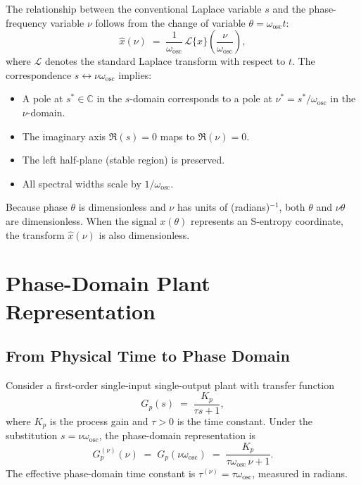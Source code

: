 \documentclass[10pt,twocolumn]{article}
\theoremstyle{plain}
\theoremstyle{definition}
\theoremstyle{remark}
\newcommand{\omegaosc}{\omega_{\mathrm{osc}}}
\begin{document}
The relationship between the conventional Laplace variable $s$ and the
phase-frequency variable $\nu$ follows from the change of variable
$\theta = \omegaosc t$:
\begin{equation}
  \hat{x}(\nu) \;=\; \frac{1}{\omegaosc}\,\mathcal{L}\{x\}
                      \!\left(\frac{\nu}{\omegaosc}\right),
  \label{eq:pdlt_conv}
\end{equation}
where $\mathcal{L}$ denotes the standard Laplace transform with respect
to $t$.  The correspondence $s \leftrightarrow \nu\omegaosc$ implies:

\begin{itemize}
  \item A pole at $s^* \in \mathbb{C}$ in the $s$-domain corresponds to
        a pole at $\nu^* = s^*/\omegaosc$ in the $\nu$-domain.
  \item The imaginary axis $\Re(s) = 0$ maps to $\Re(\nu) = 0$.
  \item The left half-plane (stable region) is preserved.
  \item All spectral widths scale by $1/\omegaosc$.
\end{itemize}

Because phase $\theta$ is dimensionless and $\nu$ has units of
(radians)$^{-1}$, both $\theta$ and $\nu\theta$ are dimensionless.
When the signal $x(\theta)$ represents an S-entropy coordinate, the
transform $\hat{x}(\nu)$ is also dimensionless.

\section{Phase-Domain Plant Representation}
\label{sec:plant}

\subsection{From Physical Time to Phase Domain}
\label{ssec:phys2phase}

Consider a first-order single-input single-output plant with transfer
function
\begin{equation}
  G_p(s) \;=\; \frac{K_p}{\tau s + 1},
  \label{eq:firstorder}
\end{equation}
where $K_p$ is the process gain and $\tau > 0$ is the time constant.
Under the substitution $s = \nu\omegaosc$, the phase-domain
representation is
\begin{equation}
  G_p^{(\nu)}(\nu) \;=\; G_p(\nu\omegaosc)
  \;=\; \frac{K_p}{\tau\omegaosc\,\nu + 1}.
  \label{eq:firstorder_phase}
\end{equation}
The effective phase-domain time constant is $\tau^{(\nu)} = \tau\omegaosc$,
measured in radians.
\end{document}
